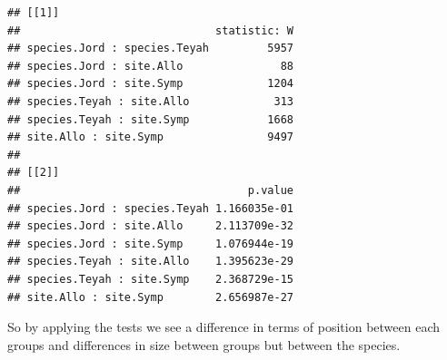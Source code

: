 \documentclass[]{book}
\begin{document}
\begin{verbatim}
## [[1]]
##                              statistic: W
## species.Jord : species.Teyah         5957
## species.Jord : site.Allo               88
## species.Jord : site.Symp             1204
## species.Teyah : site.Allo             313
## species.Teyah : site.Symp            1668
## site.Allo : site.Symp                9497
## 
## [[2]]
##                                   p.value
## species.Jord : species.Teyah 1.166035e-01
## species.Jord : site.Allo     2.113709e-32
## species.Jord : site.Symp     1.076944e-19
## species.Teyah : site.Allo    1.395623e-29
## species.Teyah : site.Symp    2.368729e-15
## site.Allo : site.Symp        2.656987e-27
\end{verbatim}

So by applying the tests we see a difference in terms of position between each groups and differences in size between groups but between the species.


\end{document}
